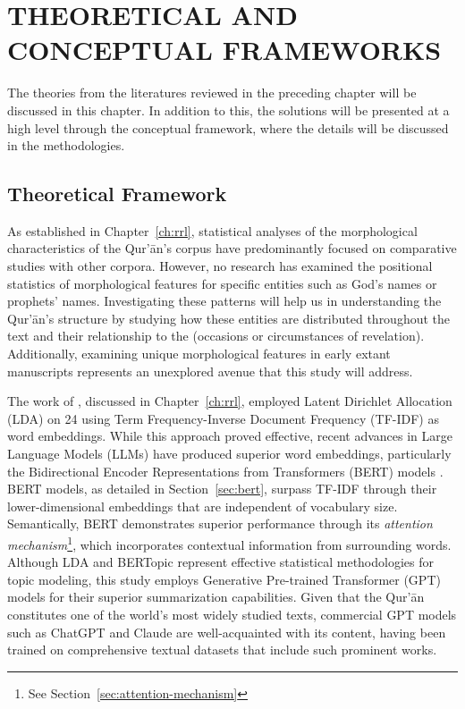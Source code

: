 \chapter{THEORETICAL AND CONCEPTUAL FRAMEWORKS}\label{ch:tf-cf}
The theories from the literatures reviewed in the preceding chapter will be discussed in this chapter. In addition to this, the solutions will be presented at a high level through the conceptual framework, where the details will be discussed in the methodologies.
\section{Theoretical Framework}
As established in Chapter~\ref{ch:rrl}, statistical analyses of the morphological characteristics of the Qur'\=an's corpus  have predominantly focused on comparative studies with other corpora. However, no research has examined the positional statistics of morphological features for specific entities such as God's names or prophets' names. Investigating these patterns will help us in understanding the Qur'\=an's structure by studying how these entities are distributed throughout the text and their relationship to the   (occasions or circumstances of revelation). Additionally, examining unique morphological features in early extant manuscripts represents an unexplored avenue that this study will address.

The work of , discussed in Chapter~\ref{ch:rrl}, employed Latent Dirichlet Allocation (LDA) on 24   using Term Frequency-Inverse Document Frequency (TF-IDF) as word embeddings. While this approach proved effective, recent advances in Large Language Models (LLMs) have produced superior word embeddings, particularly the Bidirectional Encoder Representations from Transformers (BERT) models . BERT models, as detailed in Section~\ref{sec:bert}, surpass TF-IDF through their lower-dimensional embeddings that are independent of vocabulary size. Semantically, BERT demonstrates superior performance through its \textit{attention mechanism}\footnote{See Section~\ref{sec:attention-mechanism}}, which incorporates contextual information from surrounding words. Although LDA and BERTopic \cite{grootendorst2022bertopic} represent effective statistical methodologies for topic modeling, this study employs Generative Pre-trained Transformer (GPT) models for their superior summarization capabilities. Given that the Qur'\=an constitutes one of the world's most widely studied texts, commercial GPT models such as ChatGPT and Claude are well-acquainted with its content, having been trained on comprehensive textual datasets that include such prominent works.

